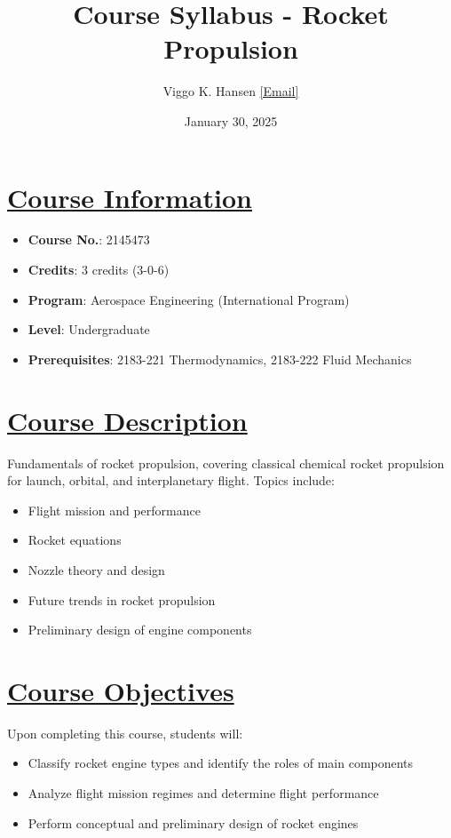 \documentclass[12pt]{article}
\title{Course Syllabus - Rocket Propulsion}
\author{Viggo K. Hansen \href{mailto:vkhansen@eng.chula.ac.th}{[Email]}}
\date{January 30, 2025}
\begin{document}
\maketitle

\tableofcontents

\section{\hyperref[sec:course_info]{Course Information}}
\label{sec:course_info}
\begin{itemize}
    \item \textbf{Course No.}: 2145473
    \item \textbf{Credits}: 3 credits (3-0-6)
    \item \textbf{Program}: Aerospace Engineering (International Program)
    \item \textbf{Level}: Undergraduate
    \item \textbf{Prerequisites}: 2183-221 Thermodynamics, 2183-222 Fluid Mechanics
\end{itemize}

\section{\hyperref[sec:course_desc]{Course Description}}
\label{sec:course_desc}
Fundamentals of rocket propulsion, covering classical chemical rocket propulsion for launch, orbital, and interplanetary flight. Topics include:
\begin{itemize}
    \item Flight mission and performance
    \item Rocket equations
    \item Nozzle theory and design
    \item Future trends in rocket propulsion
    \item Preliminary design of engine components
\end{itemize}

\section{\hyperref[sec:objectives]{Course Objectives}}
\label{sec:objectives}
Upon completing this course, students will:
\begin{itemize}
    \item Classify rocket engine types and identify the roles of main components
    \item Analyze flight mission regimes and determine flight performance
    \item Perform conceptual and preliminary design of rocket engines
\end{itemize}
\end{document}
